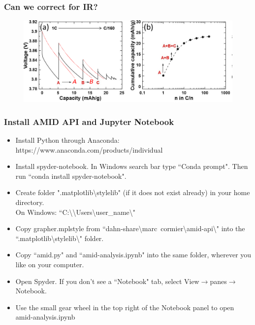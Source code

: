 \documentclass{beamer}
\begin{document}
\begin{frame}
\frametitle{Can we correct for IR?}

\begin{figure}
	\includegraphics[width=0.95\linewidth]{figs/IR_correct.pdf}
\end{figure}

\end{frame}

\begin{frame}
\frametitle{Install AMID API and Jupyter Notebook}
\fontsize{10}{10}
\begin{itemize}
	\item Install Python through Anaconda: https://www.anaconda.com/products/individual
	\item Install spyder-notebook. In Windows search bar type ``Conda prompt". Then run ``conda install spyder-notebook".
	\item Create folder ".matplotlib\textbackslash stylelib" (if it does not exist already) in your home directory.\\
		  On Windows: ``C:\textbackslash \textbackslash Users\textbackslash user\_name\textbackslash"
	\item Copy grapher.mplstyle from ``dahn-share\textbackslash marc~cormier\textbackslash amid-api\textbackslash" into the 
	      ``.matplotlib\textbackslash stylelib\textbackslash" folder.
	\item Copy ``amid.py" and ``amid-analysis.ipynb" into the same folder, wherever you like on your computer.
	\item Open Spyder. If you don't see a ``Notebook" tab, select View$\rightarrow$panes$\rightarrow$Notebook.
	\item Use the small gear wheel in the top right of the Notebook panel to open amid-analysis.ipynb
\end{itemize}

\end{frame}
\end{document}
